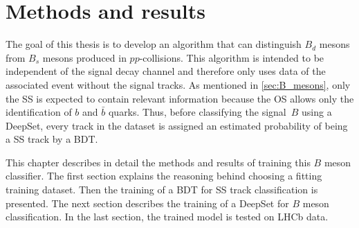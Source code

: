 \chapter{Methods and results} %


The goal of this thesis is to develop an algorithm that can distinguish $B_d$ mesons from $B_s$ mesons produced in $pp$-collisions.
This algorithm is intended to be independent of the signal decay channel and therefore only uses data of the associated event without the signal tracks.
As mentioned in \autoref{sec:B_mesons}, only the SS is expected to contain relevant information because the OS allows only the identification of $b$ and $\bar{b}$ quarks. %
Thus, before classifying the signal~$B$ using a DeepSet, every track in the dataset is assigned an estimated probability of being a SS track by a BDT.

This chapter describes in detail the methods and results of training this $B$ meson classifier.
The first section explains the reasoning behind choosing a fitting training dataset.
Then the training of a BDT for SS track classification is presented.
The next section describes the training of a DeepSet for $B$ meson classification.
In the last section, the trained model is tested on LHCb data.




